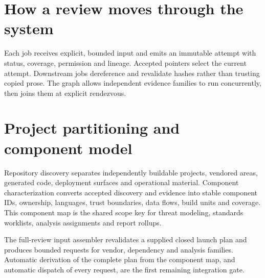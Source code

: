 \documentclass[10pt,a4paper]{article}
\begin{document}
\section{How a review moves through the system}
\begin{center}
\end{center}

Each job receives explicit, bounded input and emits an immutable attempt with status, coverage,
permission and lineage. Accepted pointers select the current attempt. Downstream jobs dereference
and revalidate hashes rather than trusting copied prose. The graph allows independent evidence
families to run concurrently, then joins them at explicit rendezvous.

\section{Project partitioning and component model}
Repository discovery separates independently buildable projects, vendored areas, generated code,
deployment surfaces and operational material. Component characterization converts accepted
discovery and evidence into stable component IDs, ownership, languages, trust boundaries, data
flows, build units and coverage. This component map is the shared scope key for threat modeling,
standards worklists, analysis assignments and report rollups.

The full-review input assembler revalidates a supplied closed launch plan and produces bounded
requests for vendor, dependency and analysis families. Automatic derivation of the complete plan
from the component map, and automatic dispatch of every request, are the first remaining integration
gate.
\end{document}
